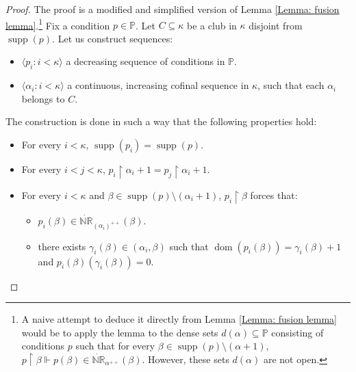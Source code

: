\documentclass[11pt]{amsart}
\renewcommand{\restriction}{\mathbin\upharpoonright}    %
\theoremstyle{definition}
\newcounter{condition}
\theoremstyle{remark}
\newcommand\<{{<}}
\DeclareMathOperator{\supp}{supp}
\newcommand{\dom}{\mathop{\mathrm{dom}}\nolimits}
\newcommand{\po}{\mathbb{P}}
\newcommand{\la}{\langle}
\newcommand{\ra}{\rangle}
\begin{document}
    \begin{proof}
        The proof is a modified and simplified version of Lemma \ref{Lemma: fusion lemma}.\footnote{A naive attempt to deduce it directly from Lemma \ref{Lemma: fusion lemma} would be to apply the lemma to the dense sets $d(\alpha)\subseteq \po$ consisting of conditions $p$ such that for every $\beta\in \supp(p)\setminus (\alpha+1)$, $p\restriction \beta \Vdash p(\beta)\in \dot{\mathbb{NR}}_{\alpha^{++}}(\beta)$. However, these sets $d(\alpha)$ are not open.}
        Fix a condition $p\in \po$. Let $C\subseteq \kappa$ be a club in $\kappa$ disjoint from $\supp(p)$. Let us construct sequences:
        \begin{itemize}
            \item $\la p_i \colon i<\kappa \ra$ a decreasing sequence of conditions in $\po$.
            \item $\la \alpha_i \colon i<\kappa \ra$ a continuous, increasing cofinal sequence in $\kappa$, such that each $\alpha_i$ belongs to $C$.
        \end{itemize}
The construction is done in such a way that the following properties hold:
    \begin{itemize}
        \item For every $i<\kappa$, $\supp(p_i) = \supp(p)$.
        \item For every $i<j<\kappa$, $p_{i}\restriction \alpha_i+1 = p_j \restriction \alpha_i+1$.
        \item For every $i<\kappa$ and $\beta\in \supp(p)\setminus (\alpha_{i}+1)$, $p_i\restriction \beta$ forces that:
        \begin{itemize}
            \item $p_i(\beta)\in \dot{\mathbb{NR}}_{(\alpha_{i})^{++}}(\beta)$.
            \item there exists $\gamma_i(\beta) \in (\alpha_i, \beta)$ such that $\dom(p_{i}(\beta) )= \gamma_i(\beta)+1$ and $p_{i}(\beta)(\gamma_i(\beta)) = 0$.
        \end{itemize}
        
    \end{itemize}
    

\end{proof}
\end{document}
